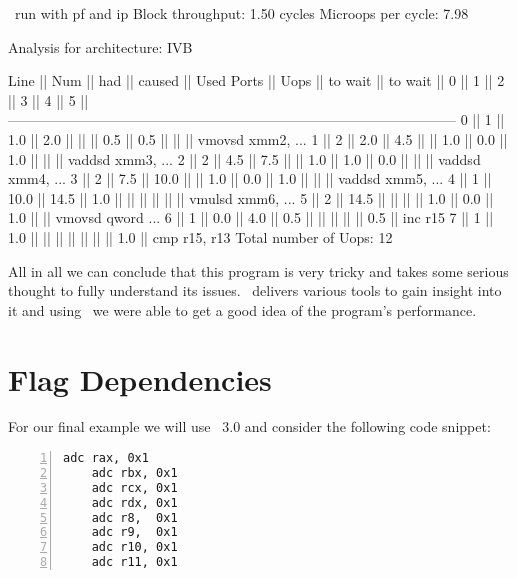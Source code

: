 \begin{LabeledExample}{\suaca\ run with pf and ip}{\label{ex:deponly}}
    Block throughput: 1.50 cycles
    Microops per cycle: 7.98
    
    Analysis for architecture: IVB
    
     Line  ||   Num   ||   had   || caused  ||            Used Ports
           ||   Uops  || to wait || to wait ||   0   ||   1   ||   2   ||   3   ||   4   ||   5   ||
     ------------------------------------------------------------------------------------------------
       0   ||    1    ||   1.0   ||   2.0   ||       ||       ||  0.5  ||  0.5  ||       ||       || vmovsd xmm2, ...
       1   ||    2    ||   2.0   ||   4.5   ||       ||  1.0  ||  0.0  ||  1.0  ||       ||       || vaddsd xmm3, ...
       2   ||    2    ||   4.5   ||   7.5   ||       ||  1.0  ||  1.0  ||  0.0  ||       ||       || vaddsd xmm4, ...
       3   ||    2    ||   7.5   ||  10.0   ||       ||  1.0  ||  0.0  ||  1.0  ||       ||       || vaddsd xmm5, ...
       4   ||    1    ||  10.0   ||  14.5   ||  1.0  ||       ||       ||       ||       ||       || vmulsd xmm6, ...
       5   ||    2    ||  14.5   ||         ||       ||       ||  1.0  ||  0.0  ||  1.0  ||       || vmovsd qword ...
       6   ||    1    ||   0.0   ||   4.0   ||  0.5  ||       ||       ||       ||       ||  0.5  || inc r15
       7   ||    1    ||   1.0   ||         ||       ||       ||       ||       ||       ||  1.0  || cmp r15, r13
    Total number of Uops: 12
\end{LabeledExample}


All in all we can conclude that this program is very tricky and takes some serious thought to fully understand its issues. \suaca\ delivers various tools to gain insight into it and using \suaca\ we were able to get a good idea of the program's performance.


\section{Flag Dependencies}

For our final example we will use \iaca\ $3.0$ and consider the following code snippet:

\begin{mdframed}[backgroundcolor=light-gray, roundcorner=10pt,leftmargin=1, rightmargin=1, innerleftmargin=15, innertopmargin=1,innerbottommargin=1, outerlinewidth=1, linecolor=light-gray]
    \begin{lstlisting}[language={myLang}, basicstyle=\small, numbers=left]
    adc rax, 0x1
    adc rbx, 0x1
    adc rcx, 0x1
    adc rdx, 0x1
    adc r8,  0x1
    adc r9,  0x1
    adc r10, 0x1
    adc r11, 0x1
    \end{lstlisting}
\end{mdframed}

